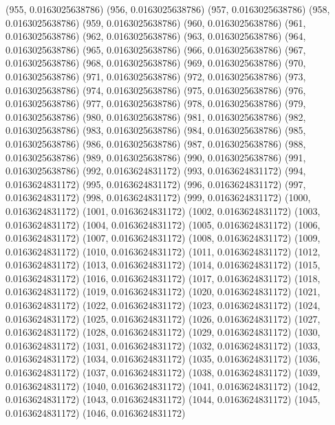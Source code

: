{					(955, 0.0163025638786)
					(956, 0.0163025638786)
					(957, 0.0163025638786)
					(958, 0.0163025638786)
					(959, 0.0163025638786)
					(960, 0.0163025638786)
					(961, 0.0163025638786)
					(962, 0.0163025638786)
					(963, 0.0163025638786)
					(964, 0.0163025638786)
					(965, 0.0163025638786)
					(966, 0.0163025638786)
					(967, 0.0163025638786)
					(968, 0.0163025638786)
					(969, 0.0163025638786)
					(970, 0.0163025638786)
					(971, 0.0163025638786)
					(972, 0.0163025638786)
					(973, 0.0163025638786)
					(974, 0.0163025638786)
					(975, 0.0163025638786)
					(976, 0.0163025638786)
					(977, 0.0163025638786)
					(978, 0.0163025638786)
					(979, 0.0163025638786)
					(980, 0.0163025638786)
					(981, 0.0163025638786)
					(982, 0.0163025638786)
					(983, 0.0163025638786)
					(984, 0.0163025638786)
					(985, 0.0163025638786)
					(986, 0.0163025638786)
					(987, 0.0163025638786)
					(988, 0.0163025638786)
					(989, 0.0163025638786)
					(990, 0.0163025638786)
					(991, 0.0163025638786)
					(992, 0.0163624831172)
					(993, 0.0163624831172)
					(994, 0.0163624831172)
					(995, 0.0163624831172)
					(996, 0.0163624831172)
					(997, 0.0163624831172)
					(998, 0.0163624831172)
					(999, 0.0163624831172)
					(1000, 0.0163624831172)
					(1001, 0.0163624831172)
					(1002, 0.0163624831172)
					(1003, 0.0163624831172)
					(1004, 0.0163624831172)
					(1005, 0.0163624831172)
					(1006, 0.0163624831172)
					(1007, 0.0163624831172)
					(1008, 0.0163624831172)
					(1009, 0.0163624831172)
					(1010, 0.0163624831172)
					(1011, 0.0163624831172)
					(1012, 0.0163624831172)
					(1013, 0.0163624831172)
					(1014, 0.0163624831172)
					(1015, 0.0163624831172)
					(1016, 0.0163624831172)
					(1017, 0.0163624831172)
					(1018, 0.0163624831172)
					(1019, 0.0163624831172)
					(1020, 0.0163624831172)
					(1021, 0.0163624831172)
					(1022, 0.0163624831172)
					(1023, 0.0163624831172)
					(1024, 0.0163624831172)
					(1025, 0.0163624831172)
					(1026, 0.0163624831172)
					(1027, 0.0163624831172)
					(1028, 0.0163624831172)
					(1029, 0.0163624831172)
					(1030, 0.0163624831172)
					(1031, 0.0163624831172)
					(1032, 0.0163624831172)
					(1033, 0.0163624831172)
					(1034, 0.0163624831172)
					(1035, 0.0163624831172)
					(1036, 0.0163624831172)
					(1037, 0.0163624831172)
					(1038, 0.0163624831172)
					(1039, 0.0163624831172)
					(1040, 0.0163624831172)
					(1041, 0.0163624831172)
					(1042, 0.0163624831172)
					(1043, 0.0163624831172)
					(1044, 0.0163624831172)
					(1045, 0.0163624831172)
					(1046, 0.0163624831172)
}
